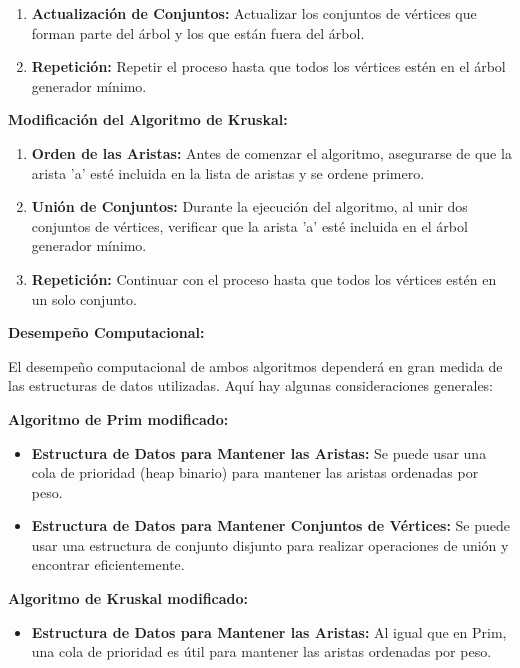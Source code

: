 \documentclass[answers, 11pt]{exam}
\begin{document}
\begin{questions}
\begin{solution}
\begin{enumerate}
  \item \textbf{Actualización de Conjuntos:}
  Actualizar los conjuntos de vértices que forman parte del árbol y los que están 
  fuera del árbol.

  \item \textbf{Repetición:}
  Repetir el proceso hasta que todos los vértices estén en el árbol generador mínimo.
\end{enumerate}

\textbf{Modificación del Algoritmo de Kruskal:}

\begin{enumerate}
  \item \textbf{Orden de las Aristas:}
  Antes de comenzar el algoritmo, asegurarse de que la arista 'a' esté incluida 
  en la lista de aristas y se ordene primero.

  \item \textbf{Unión de Conjuntos:}
  Durante la ejecución del algoritmo, al unir dos conjuntos de vértices, verificar 
  que la arista 'a' esté incluida en el árbol generador mínimo.

  \item \textbf{Repetición:}
  Continuar con el proceso hasta que todos los vértices estén en un solo conjunto.

\end{enumerate}

\textbf{Desempeño Computacional:}

El desempeño computacional de ambos algoritmos dependerá en gran medida de las 
estructuras de datos utilizadas. Aquí hay algunas consideraciones generales:

\textbf{Algoritmo de Prim modificado:}

\begin{itemize}
  \item \textbf{Estructura de Datos para Mantener las Aristas:}
  Se puede usar una cola de prioridad (heap binario) para mantener las 
  aristas ordenadas por peso.
  
  \item \textbf{Estructura de Datos para Mantener Conjuntos de Vértices:}
  Se puede usar una estructura de conjunto disjunto para realizar 
  operaciones de unión y encontrar eficientemente.
\end{itemize}

\textbf{Algoritmo de Kruskal modificado:}

\begin{itemize}
    \item \textbf{Estructura de Datos para Mantener las Aristas:}
  Al igual que en Prim, una cola de prioridad es útil para mantener las aristas 
  ordenadas por peso.


\end{itemize}
\end{solution}
\end{questions}
\end{document}
